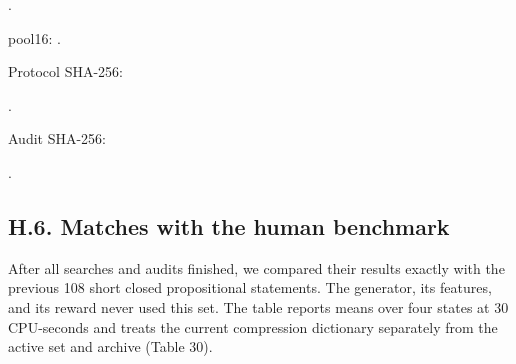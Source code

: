 \documentclass[pdflatex,sn-basic,Numbered]{sn-jnl}
\begin{document}
.

pool16: .

Protocol SHA-256:

.

Audit SHA-256:

.

\subsection*{H.6. Matches with the human benchmark}\label{h.6.-matches-with-the-human-benchmark}

After all searches and audits finished, we compared their results exactly with the previous 108 short closed propositional statements. The generator, its features, and its reward never used this set. The table reports means over four states at 30 CPU-seconds and treats the current compression dictionary separately from the active set and archive (Table 30).

\begingroup
\small
\setlength{\tabcolsep}{3pt}
\renewcommand{\arraystretch}{1.13}
\end{document}
